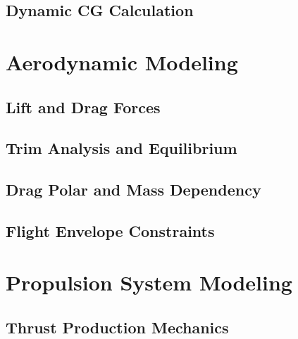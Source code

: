 \documentclass[12pt, a4paper]{report}
\begin{document}
\subsection{Dynamic CG Calculation}
\label{sec:dynamic_cg_calculation}


 
\section{Aerodynamic Modeling}
\label{sec:aerodynamic_modeling}


\subsection{Lift and Drag Forces}
\label{sec:lift_and_drag_forces}


\subsection{Trim Analysis and Equilibrium}
\label{sec:trim_analysis_and_equilibrium}


\subsection{Drag Polar and Mass Dependency}
\label{sec:drag_polar_and_mass_dependency}


\subsection{Flight Envelope Constraints}
\label{sec:flight_envelope_constraints}



\section{Propulsion System Modeling}
\label{sec:propulsion_modeling}


\subsection{Thrust Production Mechanics}
\label{sec:thrust_production_mechanics}

\end{document}
